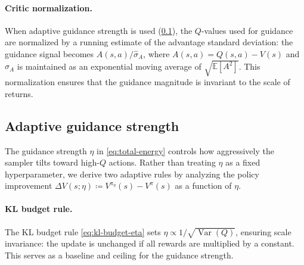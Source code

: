 \documentclass{article}
\theoremstyle{plain}
\theoremstyle{definition}
\theoremstyle{remark}
\newcommand{\E}{\mathbb{E}}
\DeclareMathOperator{\Var}{Var}
\begin{document}
\paragraph{Critic normalization.}
When adaptive guidance strength is used (\cref{sec:adaptive-eta}), the $Q$-values used for guidance are normalized by a running estimate of the advantage standard deviation: the guidance signal becomes $A(s,a) / \hat{\sigma}_A$, where $A(s,a) = Q(s,a) - V(s)$ and $\hat{\sigma}_A$ is maintained as an exponential moving average of $\sqrt{\E[A^2]}$.
This normalization ensures that the guidance magnitude is invariant to the scale of returns.

\subsection{Adaptive guidance strength}
\label{sec:adaptive-eta}

The guidance strength $\eta$ in \cref{eq:total-energy} controls how aggressively the sampler tilts toward high-$Q$ actions.
Rather than treating $\eta$ as a fixed hyperparameter, we derive two adaptive rules by analyzing the policy improvement $\Delta V(s;\eta) \coloneqq V^{\pi_\eta}(s) - V^\pi(s)$ as a function of $\eta$.

\paragraph{KL budget rule.}
The KL budget rule \cref{eq:kl-budget-eta} sets $\eta \propto 1/\sqrt{\Var(Q)}$, ensuring scale invariance: the update is unchanged if all rewards are multiplied by a constant. This serves as a baseline and ceiling for the guidance strength.
\end{document}
